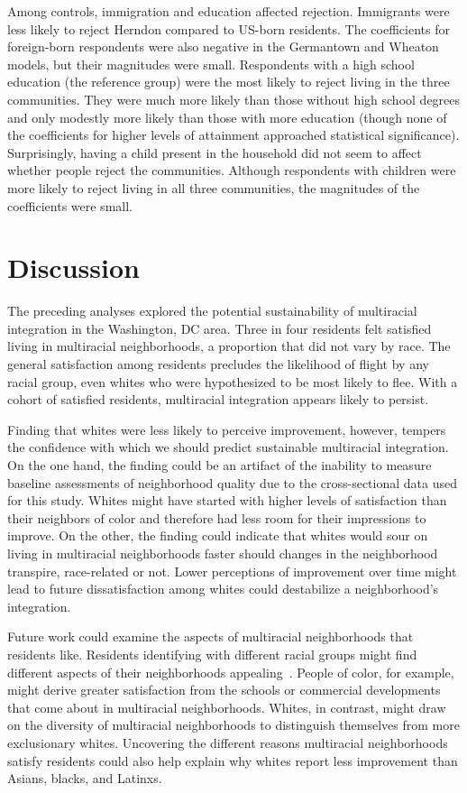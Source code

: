 \documentclass{baderart}
\begin{document}

Among controls, immigration and education affected rejection. Immigrants were less likely to reject Herndon compared to US-born residents. The coefficients for foreign-born respondents were also negative in the Germantown and Wheaton models, but their magnitudes were small. Respondents with a high school education (the reference group) were the most likely to reject living in the three communities. They were much more likely than those without high school degrees and only modestly more likely than those with more education (though none of the coefficients for higher levels of attainment approached statistical significance). Surprisingly, having a child present in the household did not seem to affect whether people reject the communities. Although respondents with children were more likely to reject living in all three communities, the magnitudes of the coefficients were small.  

\section{Discussion}
The preceding analyses explored the potential sustainability of multiracial integration in the Washington, DC area. Three in four residents felt satisfied living in multiracial neighborhoods, a proportion that did not vary by race. The general satisfaction among residents precludes the likelihood of flight by any racial group, even whites who were hypothesized to be most likely to flee. With a cohort of satisfied residents, multiracial integration appears likely to persist.

Finding that whites were less likely to perceive improvement, however, tempers the confidence with which we should predict sustainable multiracial integration. On the one hand, the finding could be an artifact of the inability to measure baseline assessments of neighborhood quality due to the cross-sectional data used for this study. Whites might have started with higher levels of satisfaction than their neighbors of color and therefore had less room for their impressions to improve. On the other, the finding could indicate that whites would sour on living in multiracial neighborhoods faster should changes in the neighborhood transpire, race-related or not. Lower perceptions of improvement over time might lead to future dissatisfaction among whites could destabilize a neighborhood's integration.

Future work could examine the aspects of multiracial neighborhoods that residents like. Residents identifying with different racial groups might find different aspects of their neighborhoods appealing~\citep{spitz_segregated_2015}. People of color, for example, might derive greater satisfaction from the schools or commercial developments that come about in multiracial neighborhoods. Whites, in contrast, might draw on the diversity of multiracial neighborhoods to distinguish themselves from more exclusionary whites. Uncovering the different reasons multiracial neighborhoods satisfy residents could also help explain why whites report less improvement than Asians, blacks, and Latinxs. 
\end{document}
